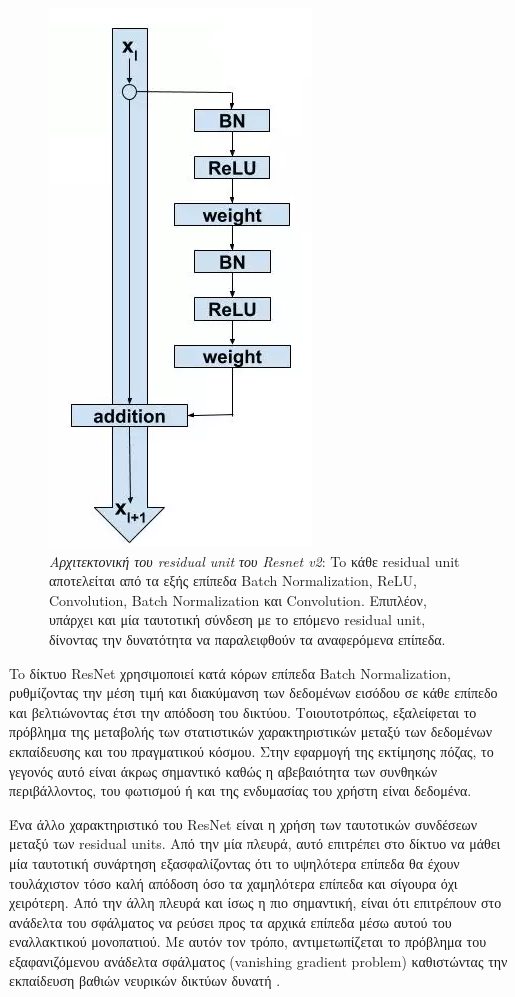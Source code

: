 \begin{figure}[H]
	\centering
	\includegraphics[scale=0.3]{images/chapter3/residual_block.png}
	\caption[Αρχιτεκτονική του residual unit του resnet\_v2\_50]{\textsl{Αρχιτεκτονική του residual unit του Resnet v2}: To κάθε residual unit αποτελείται από τα εξής επίπεδα Batch Normalization, ReLU, Convolution, Batch Normalization και Convolution. Επιπλέον, υπάρχει και μία ταυτοτική σύνδεση με το επόμενο residual unit, δίνοντας την δυνατότητα να παραλειφθούν τα αναφερόμενα επίπεδα.}
	\label{fig:residual_unit}
\end{figure} 

To δίκτυο ResNet χρησιμοποιεί κατά κόρων επίπεδα Batch Normalization, ρυθμίζοντας την μέση τιμή και διακύμανση των δεδομένων εισόδου σε κάθε επίπεδο και βελτιώνοντας έτσι την απόδοση του δικτύου. Τοιουτοτρόπως, εξαλείφεται το πρόβλημα της μεταβολής των στατιστικών χαρακτηριστικών μεταξύ των δεδομένων εκπαίδευσης και του πραγματικού κόσμου. Στην εφαρμογή της εκτίμησης πόζας, το γεγονός αυτό είναι άκρως σημαντικό καθώς η αβεβαιότητα των συνθηκών περιβάλλοντος, του φωτισμού ή και της ενδυμασίας του χρήστη είναι δεδομένα.

Ένα άλλο χαρακτηριστικό του ResNet είναι η χρήση των ταυτοτικών συνδέσεων μεταξύ των residual units. Από την μία πλευρά, αυτό επιτρέπει στο δίκτυο να μάθει μία ταυτοτική συνάρτηση εξασφαλίζοντας ότι το υψηλότερα επίπεδα θα έχουν τουλάχιστον τόσο καλή απόδοση όσο τα χαμηλότερα επίπεδα και σίγουρα όχι χειρότερη. Από την άλλη πλευρά και ίσως η πιο σημαντική, είναι ότι επιτρέπουν στο ανάδελτα του σφάλματος να ρεύσει προς τα αρχικά επίπεδα μέσω αυτού του εναλλακτικού μονοπατιού. Με αυτόν τον τρόπο, αντιμετωπίζεται το πρόβλημα του εξαφανιζόμενου ανάδελτα σφάλματος (vanishing gradient problem) καθιστώντας την εκπαίδευση βαθιών νευρικών δικτύων δυνατή \cite{identity_mappings}.

